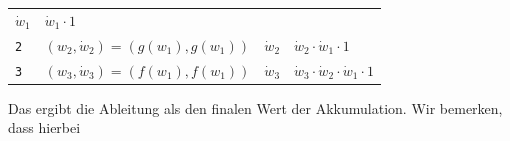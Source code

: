 \documentclass[
]{book}
\theoremstyle{definition}
\theoremstyle{definition}
\theoremstyle{definition}
\theoremstyle{definition}
\theoremstyle{remark}
\begin{document}
\begin{longtable}[]{@{}llll@{}}
\begin{minipage}[t]{0.17\columnwidth}
\(\dot w_1\)\strut
\end{minipage} & \begin{minipage}[t]{0.22\columnwidth}\raggedright
\(\dot w_1 \cdot 1\)\strut
\end{minipage}\tabularnewline
\begin{minipage}[t]{0.17\columnwidth}\raggedright
\texttt{2}\strut
\end{minipage} & \begin{minipage}[t]{0.33\columnwidth}\raggedright
\((w_2, \dot w_2) = (g(w_1), g(w_1))\)\strut
\end{minipage} & \begin{minipage}[t]{0.17\columnwidth}\raggedright
\(\dot w_2\)\strut
\end{minipage} & \begin{minipage}[t]{0.22\columnwidth}\raggedright
\(\dot w_2 \cdot\dot w_1 \cdot 1\)\strut
\end{minipage}\tabularnewline
\begin{minipage}[t]{0.17\columnwidth}\raggedright
\texttt{3}\strut
\end{minipage} & \begin{minipage}[t]{0.33\columnwidth}\raggedright
\((w_3, \dot w_3) = (f(w_1), f(w_1))\)\strut
\end{minipage} & \begin{minipage}[t]{0.17\columnwidth}\raggedright
\(\dot w_3\)\strut
\end{minipage} & \begin{minipage}[t]{0.22\columnwidth}\raggedright
\(\dot w_3 \cdot\dot w_2 \cdot\dot w_1 \cdot 1\)\strut
\end{minipage}\tabularnewline
\bottomrule
\end{longtable}

Das ergibt die Ableitung als den finalen Wert der Akkumulation. Wir bemerken,
dass hierbei
\end{document}
